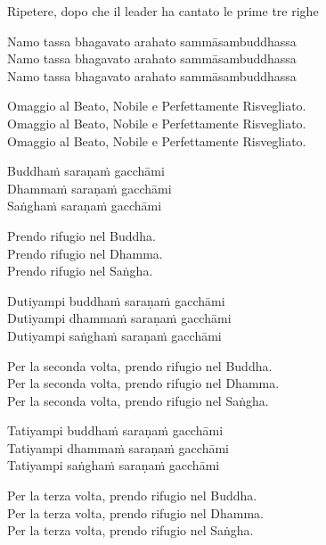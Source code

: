 \begin{instruction}
  Ripetere, dopo che il leader ha cantato le prime tre righe
\end{instruction}

Namo tassa bhagavato arahato sammāsambuddhassa\\
Namo tassa bhagavato arahato sammāsambuddhassa\\
Namo tassa bhagavato arahato sammāsambuddhassa

\begin{english}
  Omaggio al Beato, Nobile e Perfettamente Risvegliato.\\
  Omaggio al Beato, Nobile e Perfettamente Risvegliato.\\
  Omaggio al Beato, Nobile e Perfettamente Risvegliato.
\end{english}

Buddhaṁ saraṇaṁ gacchāmi\\
Dhammaṁ saraṇaṁ gacchāmi\\
Saṅghaṁ saraṇaṁ gacchāmi

\begin{english}
  Prendo rifugio nel Buddha.\\
  Prendo rifugio nel Dhamma.\\
  Prendo rifugio nel Saṅgha.
\end{english}

Dutiyampi buddhaṁ saraṇaṁ gacchāmi\\
Dutiyampi dhammaṁ saraṇaṁ gacchāmi\\
Dutiyampi saṅghaṁ saraṇaṁ gacchāmi

\begin{english}
  Per la seconda volta, prendo rifugio nel Buddha.\\
  Per la seconda volta, prendo rifugio nel Dhamma.\\
  Per la seconda volta, prendo rifugio nel Saṅgha.
\end{english}

Tatiyampi buddhaṁ saraṇaṁ gacchāmi\\
Tatiyampi dhammaṁ saraṇaṁ gacchāmi\\
Tatiyampi saṅghaṁ saraṇaṁ gacchāmi

\clearpage

\begin{english}
  Per la terza volta, prendo rifugio nel Buddha.\\
  Per la terza volta, prendo rifugio nel Dhamma.\\
  Per la terza volta, prendo rifugio nel Saṅgha.
\end{english}

